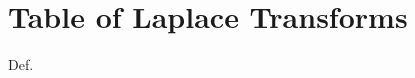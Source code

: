 \chapter{Table of Laplace Transforms}

\begin{description}
	\item[Def.] \blindtext
\end{description}
